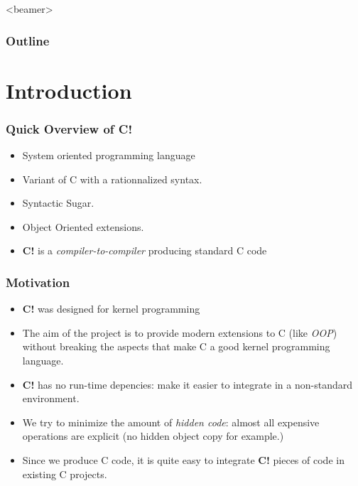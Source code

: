 \documentclass{beamer}
\title{\cbang{}}
\subtitle{Implementing Interfaces}
\author{Marwan Burelle}
\institute{
  marwan.burelle@lse.epita.fr\\
  \url{http://www.lse.epita.fr/}
}
\date{}
\newcommand{\cbang}{{\bf C!}}
\begin{document}


\begin{frame}
  \titlepage{}
\end{frame}

\begin{frame}<beamer>
  \frametitle{Outline}
  \tableofcontents
\end{frame}

\section{Introduction}

\begin{frame}
  \frametitle{Quick Overview of \cbang{}}
  \begin{itemize}
  \item System oriented programming language
  \item Variant of C with a rationnalized syntax.
  \item Syntactic Sugar.
  \item Object Oriented extensions.
  \item \cbang{} is a \emph{compiler-to-compiler} producing standard C code
  \end{itemize}
\end{frame}

\begin{frame}
  \frametitle{Motivation}
  \begin{itemize}
  \item \cbang{} was designed for kernel programming
  \item The aim of the project is to provide modern extensions to C (like
    \emph{OOP}) without breaking the aspects that make C a good kernel
    programming language.
  \item \cbang{} has no run-time depencies: make it easier to integrate in a
    non-standard environment.
  \item We try to minimize the amount of \emph{hidden code}: almost all
    expensive operations are explicit (no hidden object copy for example.)
  \item Since we produce C code, it is quite easy to integrate \cbang{} pieces
    of code in existing C projects.
  \end{itemize}
\end{frame}
\end{document}
